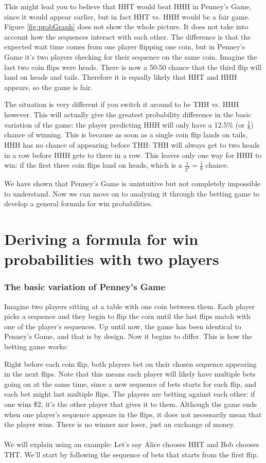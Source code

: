 \documentclass[english,12pt,a4paper,final]{article}
\begin{document}
This might lead you to believe that HHT would beat HHH in Penney's Game, since it would appear earlier, but in fact HHT vs. HHH would be a fair game. Figure \ref{fig:probGraph} does not show the whole picture. It does not take into account how the sequences interact with each other. The difference is that the expected wait time comes from one player flipping one coin, but in Penney's Game it's two players checking for their sequence on the same coin. Imagine the last two coin flips were heads. There is now a 50:50 chance that the third flip will land on heads and tails. Therefore it is equally likely that HHT and HHH appears, so the game is fair.

The situation is very different if you switch it around to be THH vs. HHH however. This will actually give the greatest probability difference in the basic variation of the game: the player predicting HHH will only have a 12.5\% (or $\frac{1}{8}$) chance of winning. This is because as soon as a single coin flip lands on tails, HHH has no chance of appearing before THH: THH will always get to two heads in a row before HHH gets to three in a row. This leaves only one way for HHH to win: if the first three coin flips land on heads, which is a $\frac{1}{2^3} = \frac{1}{8}$ chance.

We have shown that Penney's Game is unintuitive but not completely impossible to understand. Now we can move on to analyzing it through the betting game to develop a general formula for win probabilities.

\part{Deriving a formula for win probabilities with two players}

\section{The basic variation of Penney's Game}

Imagine two players sitting at a table with one coin between them. Each player picks a sequence and they begin to flip the coin until the last flips match with one of the player's sequences. Up until now, the game has been identical to Penney's Game, and that is by design. Now it begins to differ. This is how the betting game works:

Right before each coin flip, both players bet on their chosen sequence appearing in the next flips. Note that this means each player will likely have multiple bets going on at the same time, since a new sequence of bets starts for each flip, and each bet might last multiple flips. The players are betting against each other: if one wins \$2, it's the other player that gives it to them. Although the game ends when one player's sequence appears in the flips, it does not necessarily mean that the player wins. There is no winner nor loser, just an exchange of money.
\\\\
We will explain using an example: Let's say Alice chooses HHT and Bob chooses THT. We'll start by following the sequence of bets that starts from the first flip. 
\end{document}

